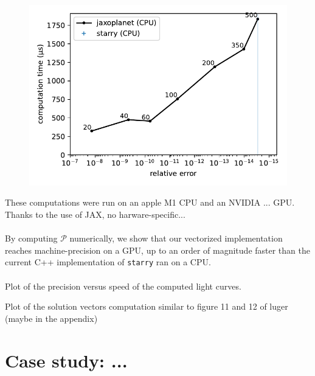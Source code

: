 \documentclass[modern]{aastex631}
\begin{document}
\begin{figure}[H]
    \begin{center}
        \includegraphics[width=\textwidth]{../workflows/performance/figures/time_n.pdf}
        \caption{}
        \label{fig:relative_error_2}
    \end{center}
\end{figure}
These computations were run on an apple M1 CPU and an NVIDIA ... GPU. Thanks to the use of JAX, no harware-specific... \\\\



By computing $\mathcal{P}$ numerically, we show that our vectorized implementation reaches machine-precision on a GPU, up to an order of magnitude faster than the current C++ implementation of \texttt{starry} ran on a CPU.\\\\

Plot of the precision versus speed of the computed light curves.

Plot of the solution vectors computation similar to figure 11 and 12 of luger (maybe in the appendix)




\section{Case study: ...}


\end{document}
